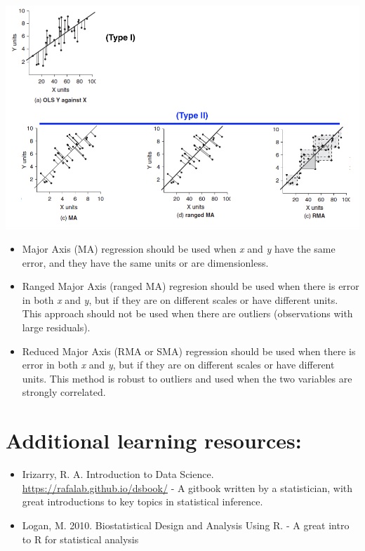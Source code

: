 \documentclass[
]{book}
\begin{document}
\begin{center}\includegraphics[width=13.89in]{images/images_5a.002} \end{center}

\begin{itemize}
\item
  Major Axis (MA) regression should be used when \emph{x} and \emph{y} have the same error, and they have the same units or are dimensionless.
\item
  Ranged Major Axis (ranged MA) regresion should be used when there is error in both \emph{x} and \emph{y}, but if they are on different scales or have different units. This approach should not be used when there are outliers (observations with large residuals).
\item
  Reduced Major Axis (RMA or SMA) regression should be used when there is error in both \emph{x} and \emph{y}, but if they are on different scales or have different units. This method is robust to outliers and used when the two variables are strongly correlated.
\end{itemize}

\hypertarget{additional-learning-resources-5}{%
\section{Additional learning resources:}\label{additional-learning-resources-5}}

\begin{itemize}
\item
  Irizarry, R. A. Introduction to Data Science. \url{https://rafalab.github.io/dsbook/} - A gitbook written by a statistician, with great introductions to key topics in statistical inference.
\item
  Logan, M. 2010. Biostatistical Design and Analysis Using R. - A great intro to R for statistical analysis
\end{itemize}
\end{document}
